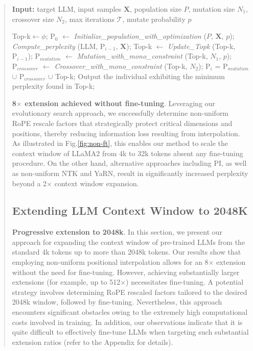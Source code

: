 \begin{abstract}
\begin{algorithm}[t]
	\small
	\caption{The search algorithm}
	\textbf{Input:} target LLM, input samples $\mathbf{X}$,   population size $P$, mutation size $N_1$, crossover size $N_2$, max iterations $\mathcal{T}$, mutate probability $p$\\

	\begin{algorithmic}[1]
		\label{alg:search}
		\STATE Top-k$\leftarrow\phi$;	
		\STATE $\text{P}_0$ $\leftarrow$ \textit{Initialize\_population\_with\_optimization} ($P$, $\mathbf{X}$, $p$); 
		\STATE \textit{Compute\_perplexity} (LLM, $\text{P}_{i-1}$, $\mathbf{X}$);
		\STATE Top-k $\leftarrow$ \textit{Update\_Topk} (Top-k, $\text{P}_{i-1}$);
		\STATE$\text{P}_{mutation}$ $\leftarrow$ \textit{Mutation\_with\_mono\_constraint} (Top-k, $N_1$, $p$); 
		\STATE $\text{P}_{crossover}$ $\leftarrow$ \textit{Crossover\_with\_mono\_constraint} (Top-k, $N_2$);
		\STATE $\text{P}_i$ = $\text{P}_{mutation}$ $\cup$ $\text{P}_{crossover}$ $\cup$ Top-k;
		\ENDFOR
		\STATE Output the individual exhibiting the minimum perplexity found in Top-k;
	\end{algorithmic}
\end{algorithm}

\textbf{8$\times$ extension achieved without fine-tuning}. Leveraging our evolutionary search approach, we successfully determine non-uniform RoPE rescale factors that strategically protect critical dimensions and positions, thereby reducing information loss resulting from interpolation. As illustrated in Fig.\ref{fig:non-ft}, this enables our method to scale the context window of LLaMA2 from 4k to 32k tokens absent any fine-tuning procedure. On the other hand, alternative approaches including PI, as well as non-uniform NTK and YaRN, result in significantly increased perplexity beyond a 2$\times$ context window expansion.

\subsection{Extending LLM Context Window to 2048K}
\label{sec:extendto2048k}

\textbf{Progressive extension to 2048k}. In this section, we present our approach for expanding the context window of pre-trained LLMs from the standard 4k tokens up to more than 2048k tokens. Our results show that employing non-uniform positional interpolation allows for an 8$\times$ extension without the need for fine-tuning. However, achieving substantially larger extensions (for example, up to 512$\times$) necessitates fine-tuning. A potential strategy involves determining RoPE rescaled factors tailored to the desired 2048k window, followed by fine-tuning. Nevertheless, this approach encounters significant obstacles owing to the extremely high computational costs involved in training. In addition, our observations indicate that it is quite difficult to effectively fine-tune LLMs when targeting such substantial extension ratios (refer to the Appendix for details).


\end{abstract}
